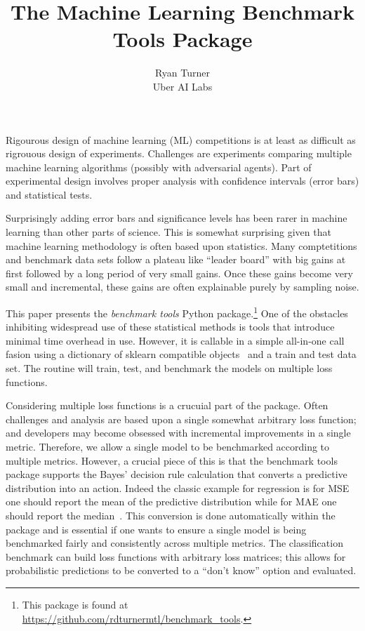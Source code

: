 \documentclass{article}
\title{The Machine Learning Benchmark Tools Package}
\author{
  Ryan Turner \\
  Uber AI Labs
}
\begin{document}

\maketitle

Rigourous design of machine learning (ML) competitions is at least as difficult as rigrouous design of experiments.
Challenges are experiments comparing multiple machine learning algorithms (possibly with adversarial agents)\@.
Part of experimental design involves proper analysis with confidence intervals (error bars) and statistical tests.

Surprisingly adding error bars and significance levels has been rarer in machine learning than other parts of science.
This is somewhat surprising given that machine learning methodology is often based upon statistics.
Many comptetitions and benchmark data sets follow a plateau like ``leader board'' with big gains at first followed by a long period of very small gains.
Once these gains become very small and incremental, these gains are often explainable purely by sampling noise.

This paper presents the \emph{benchmark tools} Python package.\footnote{This package is found at
\url{https://github.com/rdturnermtl/benchmark_tools}.}
One of the obstacles inhibiting widespread use of these statistical methods is tools that introduce minimal time overhead in use.
However, it is callable in a simple all-in-one call fasion using a dictionary of sklearn compatible objects~\citep{Pedregosa2011} and a train and test data set.
The routine will train, test, and benchmark the models on multiple loss functions.

Considering multiple loss functions is a crucuial part of the package.
Often challenges and analysis are based upon a single somewhat arbitrary loss function; and developers may become obsessed with incremental improvements in a single metric.
Therefore, we allow a single model to be benchmarked according to multiple metrics.
However, a crucial piece of this is that the benchmark tools package supports the Bayes' decision rule calculation that converts a predictive distribution into an action.
Indeed the classic example for regression is for MSE one should report the mean of the predictive distribution while for MAE one should report the median~\citep{Marchini2013}.
This conversion is done automatically within the package and is essential if one wants to ensure a single model is being benchmarked fairly and consistently across multiple metrics.
The classification benchmark can build loss functions with arbitrary loss matrices; this allows for probabilistic predictions to be converted to a ``don't know'' option and evaluated.
\end{document}
